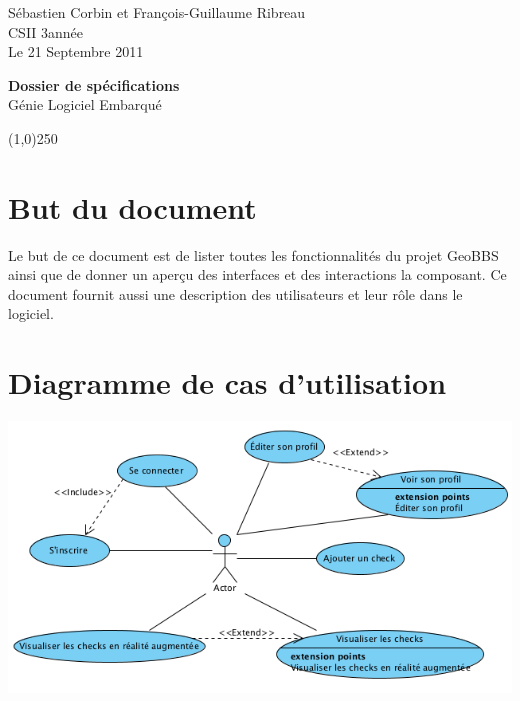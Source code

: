 \documentclass[a4paper,12pt]{report}
\begin{document}
  \begin{onehalfspace}

    \begin{titlepage}
      \begin{center}
        Sébastien Corbin et François-Guillaume Ribreau\\
        CSII 3\ieme année\\
        Le 21 Septembre 2011\\
      \end{center}
      \hrulefill
      \vspace{7cm}
      \begin{center}
        \LARGE \textbf{Dossier de spécifications}\\
        \vspace{3cm}
        \normalsize Génie Logiciel Embarqué
      \end{center}

      \vspace{9,5cm}

      \begin{center}
      \line(1,0){250}
      \end{center}

      \begin{center}
      \tiny{\currfilename}
      \end{center}
  
   \setcounter{page}{0}
    \end{titlepage}
    \clearpage

\chapter{But du document}
Le but de ce document est de lister toutes les fonctionnalités du projet GeoBBS ainsi que de donner un aperçu des interfaces et des interactions la composant. Ce document fournit aussi une description des utilisateurs et leur rôle dans le logiciel.

\chapter{Diagramme de cas d'utilisation}

\begin{center}
  \includegraphics[width=17cm]{img/diag_cas_utilisation.png}
\end{center}



\end{onehalfspace}
\end{document}
